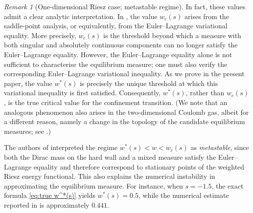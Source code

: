 \documentclass{amsart}
\theoremstyle{plain}
\theoremstyle{remark}
\newtheorem{rem}{Remark}%
\numberwithin{equation}{section}
\begin{document}
\begin{rem}[One-dimensional Riesz case; metastable regime]
In fact, these values admit a clear analytic interpretation. In \cite{KKKMMS21}, the value $w_c(s)$ arises from the saddle-point analysis, or equivalently, from the Euler--Lagrange variational equality. More precisely, $w_c(s)$ is the threshold beyond which a measure with both singular and absolutely continuous components can no longer satisfy the Euler--Lagrange equality. However, the Euler--Lagrange equality alone is not sufficient to characterise the equilibrium measure; one must also verify the corresponding Euler--Lagrange variational inequality. As we prove in the present paper, the value $w^*(s)$ is precisely the unique threshold at which this variational inequality is first satisfied. Consequently, $w^*(s)$, rather than $w_c(s)$, is the true critical value for the confinement transition.
(We note that an analogous phenomenon also arises in the two-dimensional Coulomb gas, albeit for a different reason, namely a change in the topology of the candidate equilibrium measures; see \cite{BY26}.) 

The authors of \cite{KKKMMS21} interpreted the regime $w^*(s)<w<w_c(s)$ as \emph{metastable}, since both the Dirac mass on the hard wall and a mixed measure satisfy the Euler--Lagrange equality and therefore correspond to stationary points of the weighted Riesz energy functional. This also explains the numerical instability in approximating the equilibrium measure. 
For instance, when $s=-1.5$, the exact formula \eqref{eq:true w^*(s)} yields $w^*(s)=0.5$, while the numerical estimate reported in \cite{KKKMMS21} is approximately $0.441$. 
\end{rem} 
\end{document}

